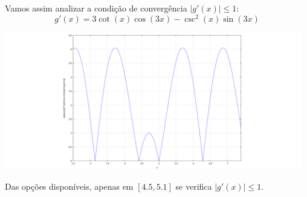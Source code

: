 Vamos assim analizar a condição de convergência $|g'(x)| \leq 1$:
\begin{equation*}
	g'(x)=3\cot(x)\cos(3x)-\csc^2(x)\sin(3x)
\end{equation*}
\begin{center} \includegraphics[height=60mm,keepaspectratio]{plotDESC1T1-5} \end{center}
Das opções disponíveis, apenas em $[4.5,5.1]$ se verifica $|g'(x)|\leq 1$.